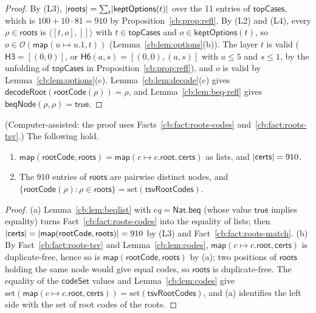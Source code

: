 \begin{proof}
By (L3), $\lvert\mathsf{roots}\rvert=\sum_t\lvert\mathsf{keptOptions}(t)\rvert$ over the 11 entries of $\mathsf{topCases}$, which
is $100+10\cdot81=910$ by Proposition~\ref{cb:prop:refl}. By (L2) and (L4), every $\rho\in\mathsf{roots}$ is
$\langle[t,o],[]\rangle$ with $t\in\mathsf{topCases}$ and $o\in\mathsf{keptOptions}(t)$, so
$o\in\mathcal O(\mathsf{map}(u\mapsto u.1,t))$ (Lemma~\ref{cb:lem:options}(b)). The layer $t$ is valid
($\mathsf{H3}=[(0,0)]$, or $\mathsf{H6}(a,s)=[(0,0),(a,s)]$ with $a\le5$ and $s\le1$, by the unfolding of
$\mathsf{topCases}$ in Proposition~\ref{cb:prop:refl}), and $o$ is valid by Lemma~\ref{cb:lem:options}(c).
Lemma~\ref{cb:lem:decode}(c) gives $\mathsf{decodeRoot}(\mathsf{rootCode}(\rho))=\rho$, and
Lemma~\ref{cb:lem:beq-refl} gives $\mathsf{beqNode}(\rho,\rho)=\mathsf{true}$.
\end{proof}

\begin{corollary}\label{cb:cor:roots}
(Computer-assisted: the proof uses Facts~\ref{cb:fact:roots-codes} and~\ref{cb:fact:roots-tsv}.) The following hold.
\begin{enumerate}[label=(\alph*)]
\item $\mathsf{map}(\mathsf{rootCode},\mathsf{roots})=\mathsf{map}(c\mapsto c.\mathsf{root},\mathsf{certs})$ as lists,
  and $\lvert\mathsf{certs}\rvert=910$.
\item The 910 entries of $\mathsf{roots}$ are pairwise distinct nodes, and
  $\{\mathsf{rootCode}(\rho):\rho\in\mathsf{roots}\}=\mathrm{set}(\mathsf{tsvRootCodes})$.
\end{enumerate}
\end{corollary}

\begin{proof}
(a) Lemma~\ref{cb:lem:beqlist} with $eq=\mathsf{Nat.beq}$ (whose value $\mathsf{true}$ implies equality) turns
Fact~\ref{cb:fact:roots-codes} into the equality of lists; then
$\lvert\mathsf{certs}\rvert=\lvert\mathsf{map}(\mathsf{rootCode},\mathsf{roots})\rvert=910$ by (L3) and
Fact~\ref{cb:fact:roots-match}.
(b) By Fact~\ref{cb:fact:roots-tsv} and Lemma~\ref{cb:lem:codes}, $\mathsf{map}(c\mapsto c.\mathsf{root},\mathsf{certs})$
is duplicate-free, hence so is $\mathsf{map}(\mathsf{rootCode},\mathsf{roots})$ by (a); two positions of
$\mathsf{roots}$ holding the same node would give equal codes, so $\mathsf{roots}$ is duplicate-free. The equality of
the $\mathsf{codeSet}$ values and Lemma~\ref{cb:lem:codes} give
$\mathrm{set}(\mathsf{map}(c\mapsto c.\mathsf{root},\mathsf{certs}))=\mathrm{set}(\mathsf{tsvRootCodes})$, and (a)
identifies the left side with the set of root codes of the roots.
\end{proof}

